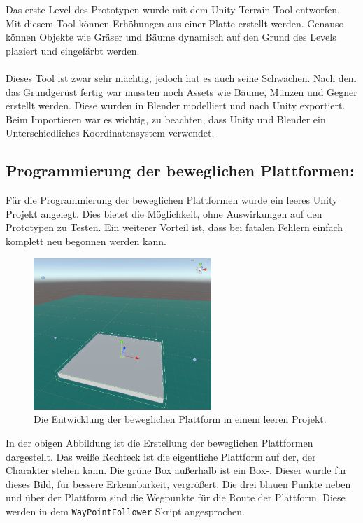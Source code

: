 Das erste Level des Prototypen wurde mit dem Unity Terrain Tool entworfen. Mit diesem Tool können Erhöhungen aus einer Platte erstellt werden. Genauso können Objekte wie Gräser und Bäume dynamisch auf den Grund des Levels plaziert und eingefärbt werden. \\\\
Dieses Tool ist zwar sehr mächtig, jedoch hat es auch seine Schwächen. Nach dem das Grundgerüst fertig war mussten noch Assets wie Bäume, Münzen und Gegner erstellt werden. Diese wurden in Blender modelliert und nach Unity exportiert. Beim Importieren war es wichtig, zu beachten, dass Unity und Blender ein Unterschiedliches Koordinatensystem verwendet. 

\pagebreak


\subsection{Programmierung der beweglichen Plattformen:}

Für die Programmierung der beweglichen Plattformen wurde ein leeres Unity Projekt angelegt. Dies bietet die Möglichkeit, ohne Auswirkungen auf den Prototypen zu Testen. Ein weiterer Vorteil ist, dass bei fatalen Fehlern einfach komplett neu begonnen werden kann. 

\begin{figure}[h]
  \centering
  \includegraphics*[width=0.6\textwidth]{chapters/04/images/V1/MovingPlatformV1.png}
  \caption{Die Entwicklung der beweglichen Plattform in einem leeren Projekt.}
  \label{fig:PE04}
\end{figure}

In der obigen Abbildung ist die Erstellung der beweglichen Plattformen dargestellt. Das weiße Rechteck ist die eigentliche Plattform auf der, der Charakter stehen kann. Die grüne Box außerhalb ist ein Box-. Dieser wurde für dieses Bild, für bessere Erkennbarkeit, vergrößert. Die drei blauen Punkte neben und über der Plattform sind die Wegpunkte für die Route der Plattform. Diese werden in dem \verb+WayPointFollower+ Skript angesprochen. \\

